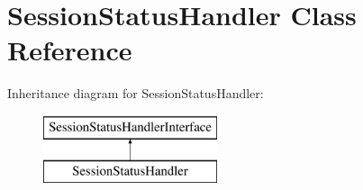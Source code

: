 \hypertarget{class_pes_1_1_session_1_1_session_status_handler}{}\section{Session\+Status\+Handler Class Reference}
\label{class_pes_1_1_session_1_1_session_status_handler}
Inheritance diagram for Session\+Status\+Handler\+:\begin{figure}[H]
\begin{center}
\leavevmode
\includegraphics[height=2.000000cm]{class_pes_1_1_session_1_1_session_status_handler}
\end{center}
\end{figure}
